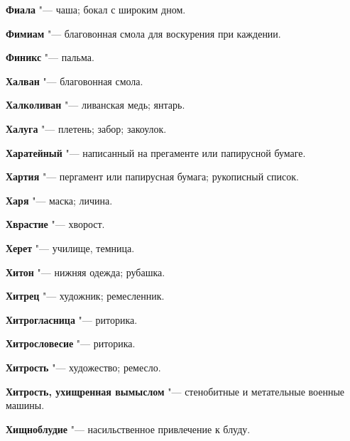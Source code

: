 \begin{mymulticols}{2}
\noindent\textbf{Фиала} "--- чаша; бокал с широким дном. 




\noindent\textbf{Фимиам} "--- благовонная смола для воскурения при каждении. 




\noindent\textbf{Финикс} "--- пальма. 









\noindent\textbf{Халван} "--- благовонная смола. 




\noindent\textbf{Халколиван} "--- ливанская медь; янтарь. 




\noindent\textbf{Халуга} "--- плетень; забор; закоулок. 




\noindent\textbf{Харатейный} "--- написанный на прегаменте или папирусной бумаге. 




\noindent\textbf{Хартия} "--- пергамент или папирусная бумага; рукописный список. 




\noindent\textbf{Харя} "--- маска; личина. 




\noindent\textbf{Хврастие} "--- хворост. 




\noindent\textbf{Херет} "--- училище, темница. 




\noindent\textbf{Хитон} "--- нижняя одежда; рубашка. 




\noindent\textbf{Хитрец} "--- художник; ремесленник. 




\noindent\textbf{Хитрогласница} "--- риторика. 




\noindent\textbf{Хитрословесие} "--- риторика. 




\noindent\textbf{Хитрость} "--- художество; ремесло. 




\noindent\textbf{Хитрость, ухищренная вымыслом} "--- стенобитные и метательные военные машины. 




\noindent\textbf{Хищноблудие} "--- насильственное привлечение к блуду. 





\end{mymulticols}
